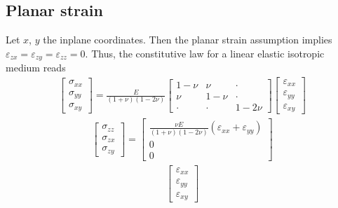 \documentclass[letterpaper,10pt,english]{jupyterBook}
\begin{document}
\subsection{Planar strain}
\label{\detokenize{ch/solids/plates-shells/stress-strain-state:planar-strain}}\label{\detokenize{ch/solids/plates-shells/stress-strain-state:solid-mechanics-small-displacements-plates-shells-stress-strain-state-planar-strain}}
\sphinxAtStartPar
Let \(x\), \(y\) the in\sphinxhyphen{}plane coordinates. Then the planar strain assumption implies \(\varepsilon_{zx} = \varepsilon_{zy} = \varepsilon_{zz} = 0\). Thus, the constitutive law for a linear elastic isotropic medium reads
\begin{equation*}
\begin{split}
\begin{bmatrix} \sigma_{xx} \\ \sigma_{yy} \\ \sigma_{xy} \end{bmatrix}
= 
\frac{E}{(1+\nu)(1-2\nu)}
\begin{bmatrix} 1-\nu & \nu & \cdot \\ \nu & 1-\nu & \cdot \\ \cdot & \cdot & 1-2\nu  \end{bmatrix}
\begin{bmatrix} \varepsilon_{xx} \\ \varepsilon_{yy} \\ \varepsilon_{xy} \end{bmatrix}
\end{split}
\end{equation*}\begin{equation*}
\begin{split}
\begin{bmatrix} \sigma_{zz} \\ \sigma_{zx} \\ \sigma_{zy} \end{bmatrix}
=
\begin{bmatrix} \frac{\nu E}{(1+\nu)(1-2\nu)} ( \varepsilon_{xx} + \varepsilon_{yy}) \\ 0 \\ 0 \end{bmatrix}
\end{split}
\end{equation*}\begin{equation*}
\begin{split}
\begin{bmatrix} \varepsilon_{xx} \\ \varepsilon_{yy} \\ \varepsilon_{xy} \end{bmatrix}

\end{split}
\end{equation*}
\end{document}

